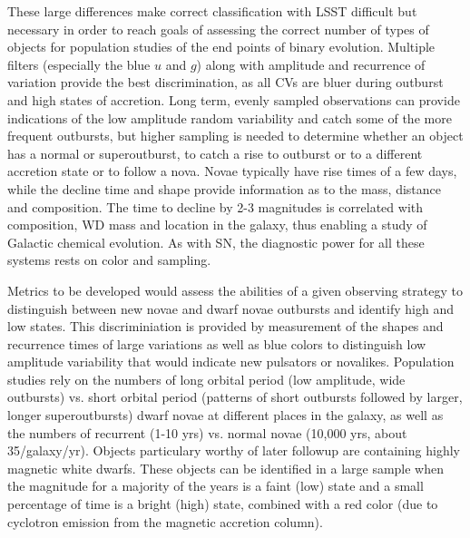 These large differences make correct classification with LSST difficult
but necessary in order to reach goals of assessing the correct number
of types of objects for population studies of the end points of
binary evolution. Multiple filters (especially the blue $u$ and $g$)
along with amplitude and recurrence of variation provide the best
discrimination, as all CVs are bluer during outburst and high states of
accretion. Long term, evenly sampled observations can provide indications
of the low amplitude random variability and catch some of the more frequent
outbursts, but higher sampling is needed to determine whether an object
has a normal or superoutburst, to catch a rise to outburst or to a
different accretion state or to follow a nova. Novae typically
have rise times of a few days, while the decline time and shape provide
information as to the mass, distance and composition. The time to decline
by 2-3 magnitudes is correlated with composition,
%
%
WD mass and location in
the galaxy, thus enabling a study of Galactic chemical evolution.  As with SN,
the diagnostic power for all these systems rests on color and sampling.

Metrics to be developed would assess the abilities of  a given observing
strategy to distinguish between new novae and dwarf novae outbursts and
identify high and low states.  This discriminiation is provided by
measurement of the shapes and recurrence times of large variations as well
as blue colors to distinguish low amplitude variability that would indicate
new pulsators or novalikes. Population studies rely on the numbers of long
orbital period (low amplitude, wide outbursts) vs. short orbital period
(patterns of short outbursts followed by larger, longer superoutbursts)
dwarf novae at different places in the galaxy, as well as the numbers of
recurrent (1-10 yrs) vs. normal novae (10,000 yrs, about 35/galaxy/yr).
Objects particulary worthy of later followup are containing highly magnetic
white dwarfs. These objects can be identified in a large sample when the
magnitude for a majority of the years is a faint (low) state and a small
percentage of time is a bright (high) state, combined with a red color (due
to cyclotron emission from the magnetic accretion column).

%
